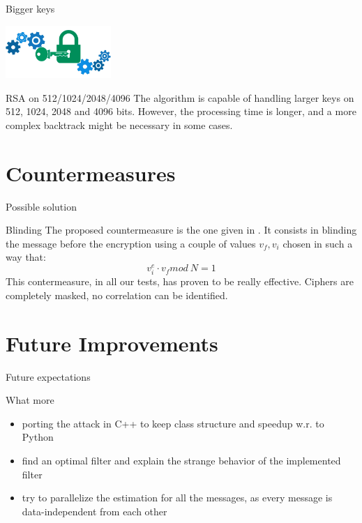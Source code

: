\documentclass{beamer}
\begin{document}
\begin{frame}{Bigger keys}
  \begin{center}
    \includegraphics[width=4cm]{./graphics/key}
  \end{center}
  \begin{block}{RSA on 512/1024/2048/4096}
		The algorithm is capable of handling larger keys on 512, 1024, 2048 and 4096 bits.
    However, the processing time is longer, and a more complex backtrack might be necessary in some cases.
	\end{block}
\end{frame}



\section{Countermeasures}
\begin{frame}{Possible solution}
    \begin{block}{Blinding}
		The proposed countermeasure is the one given in \cite{kocher1996timing}.
		It consists in blinding the message before the encryption using a couple of values $v_f, v_i$ chosen in such a way that:
		\begin{equation*}
			v_i^e \cdot v_f mod\: N = 1
		\end{equation*}
        This contermeasure, in all our tests, has proven to be really effective. Ciphers are completely masked, no correlation can be identified.
    \end{block}
\end{frame}

\section{Future Improvements}
\begin{frame}{Future expectations}
  \begin{block}{What more}
    \begin{itemize}
      \pause \item porting the attack in C++ to keep class structure and speedup w.r. to Python
      \pause \item find an optimal filter and explain the strange behavior of the implemented filter
      \pause \item try to parallelize the estimation for all the messages, as every message is data-independent from each other
    \end{itemize}
  \end{block}
\end{frame}
\end{document}
